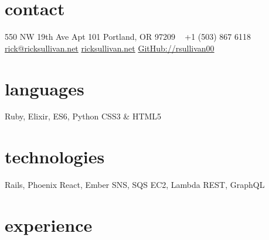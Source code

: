 \documentclass[]{friggeri-cv} %
\begin{document}


\begin{aside} %
\section{contact}
550 NW 19th Ave
Apt 101
Portland, OR 97209
~
+1 (503) 867 6118
~
\href{mailto:rick@ricksullivan.net}{rick@ricksullivan.net}
\href{https://ricksullivan.net}{ricksullivan.net}
\href{https://github.com/rsullivan00}{GitHub://rsullivan00}
%
\section{languages}
Ruby, Elixir, ES6, Python
CSS3 \& HTML5
%
\section{technologies}
Rails, Phoenix
React, Ember
SNS, SQS
EC2, Lambda
REST, GraphQL
\end{aside}


\section{experience}
\end{document}

